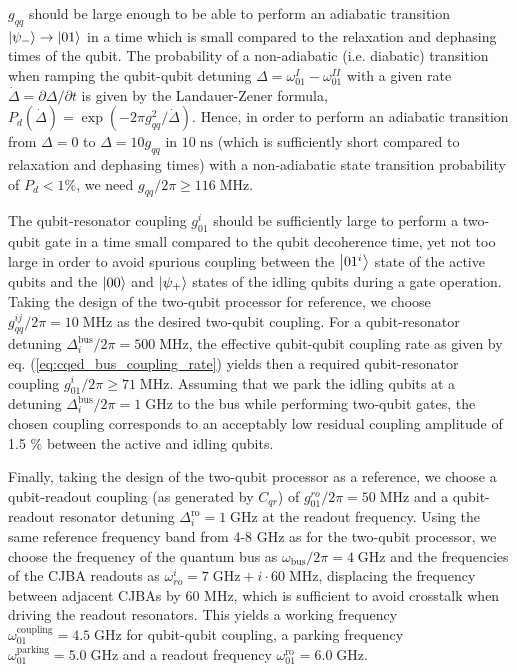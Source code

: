 \smallskip

$g_{qq}$ should be large enough to be able to perform an adiabatic transition $\left| \psi_- \right>\to\left| 01 \right>$ in a time which is small compared to the relaxation and dephasing times of the qubit. The probability of a non-adiabatic (i.e. diabatic) transition when ramping the qubit-qubit detuning $\Delta=\omega_{01}^I-\omega_{01}^{II}$ with a given rate $\dot{\Delta}=\partial \Delta/\partial t$ is given by the Landauer-Zener formula, $P_d(\dot{\Delta})=\exp{(-2\pi g_{qq}^2/\dot{\Delta})}$. Hence, in order to perform an adiabatic transition from $\Delta=0$ to $\Delta = 10g_{qq}$ in $10\;\mathrm{ns}$ (which is sufficiently short compared to relaxation and dephasing times) with a non-adiabatic state transition probability of $P_d<1\%$, we need $g_{qq}/2\pi\ge 116\;\mathrm{MHz}$.

\smallskip

The qubit-resonator coupling $g_{01}^i$ should be sufficiently large to perform a two-qubit gate in a time small compared to the qubit decoherence time, yet not too large in order to avoid spurious coupling between the $\left| 01^i \right>$ state of the active qubits and the $\left| 00 \right>$ and $\left| \psi_+ \right>$ states of the idling qubits during a gate operation. Taking the design of the two-qubit processor for reference, we choose $g_{qq}^{ij}/2\pi = 10\;\mathrm{MHz}$ as the desired two-qubit coupling. For a qubit-resonator detuning $\Delta_i^\mathrm{bus}/2\pi=500\;\mathrm{MHz}$, the effective qubit-qubit coupling rate as given by eq. (\ref{eq:cqed_bus_coupling_rate}) yields then a required qubit-resonator coupling $g_{01}^i/2\pi\ge 71\;\mathrm{MHz}$. Assuming that we park the idling qubits at a detuning $\Delta_i^\mathrm{bus}/2\pi = 1\;\mathrm{GHz}$ to the bus while performing two-qubit gates, the chosen coupling corresponds to an acceptably low residual coupling amplitude of 1.5 \% between the active and idling qubits.

\smallskip

Finally, taking the design of the two-qubit processor as a reference, we choose a qubit-readout coupling (as generated by $C_{qr}$) of $g_{01}^{ro}/2\pi = 50\;\mathrm{MHz}$ and a qubit-readout resonator detuning $\Delta_i^\mathrm{ro}=1\;\mathrm{GHz}$ at the readout frequency. Using the same reference frequency band from 4-8 GHz as for the two-qubit processor, we choose the frequency of the quantum bus as $\omega_\mathrm{bus}/2\pi=4\;\mathrm{GHz}$ and the frequencies of the CJBA readouts as $\omega_{ro}^i=7\;\mathrm{GHz}+i\cdot 60\;\mathrm{MHz}$, displacing the frequency between adjacent CJBAs by 60 MHz, which is sufficient to avoid crosstalk when driving the readout resonators. This yields a working frequency $\omega_{01}^\mathrm{coupling}=4.5\;\mathrm{GHz}$ for qubit-qubit coupling, a parking frequency $\omega_{01}^\mathrm{parking}=5.0\;\mathrm{GHz}$ and a readout frequency $\omega_{01}^\mathrm{ro}=6.0\;\mathrm{GHz}$.

